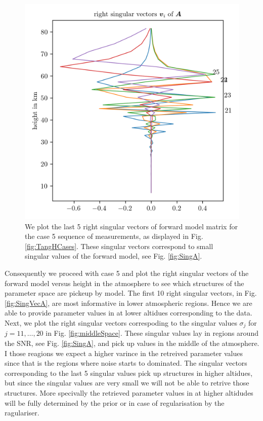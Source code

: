 \begin{figure}[ht!]
	\centering
	\includegraphics{NullVecA.png}
	\caption[Last 5 right singular vectors of forward model.]{We plot the last 5 right singular vectors of forward model matrix for the case 5 sequence of measurements, as displayed in Fig. \ref{fig:TangHCases}. These singular vectors correspond to small singular values of the forward model, see Fig. \ref{fig:SingA}.}
	\label{fig:nullSpace}
\end{figure}

Consequently we proceed with case 5 and plot the right singular vectors of the forward model versus height in the atmosphere to see which structures of the parameter space are pickeup by model.
The first 10 right singular vectors, in Fig. \ref{fig:SingVecA}, are most informative in lower atmospheric regions.
Hence we are able to provide parameter values in at lower altidues corresponding to the data.
Next, we plot the right singular vectors correspoding to the singular values $\sigma_j$ for $j = 11, \dots, 20$ in Fig. \ref{fig:middleSpace}.
These singular values lay in regions around the SNR, see Fig. \ref{fig:SingA}, and pick up values in the middle of the atmosphere.
I those reagions we expect a higher varince in the retreived parameter values since that is the regions where noise starts to dominated.
The singular vectors corresponding to the last 5 singular values pick up structures in higher altidues, but since the singular values are very small we will not be able to retrive those structures.
More specivally the retrieved parameter values in at higher altidudes will be fully determined by the prior or in case of regularisation by the ragulariser.

